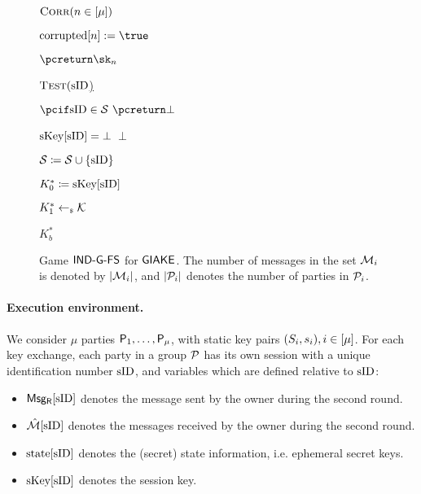 \begin{figure}[h!]
{{\begin{minipage}[t]{7cm}
				\underline{$\CorruptO(n \in [\mu])$}
				\begin{nicodemus}
					\item $\corrupted[n] := \true$
					\item $\pcreturn \sk_n$\\
				\end{nicodemus}
				
				\underline{$\TestO(\sID$)}
				\begin{nicodemus}
					\item $\pcif \sid\in\testSessions~ \pcreturn \bot$ 
					\item \pcif $\skeys[\sID] = \bot$~\pcreturn $\bot$
					\item $\testSessions \coloneqq \testSessions \cup \{\sid\}$
					\item $K_0^* \coloneqq \skeys[\sID]$
					\item $K_1^* \getsr \mathcal{K}$
					\item \pcreturn $K_b^*$
				\end{nicodemus}
			\end{minipage}
	}}
	\caption{
	Game $\GIAKEsecurityPFSGame$ for $\GIAKE$.
	The number of messages in the set $\GakeIniMesSet[\GakeUId]$ is denoted by $|\GakeIniMesSet[\GakeUId]|$, and 
	$|\peers_\GakeUId|$ denotes the number of parties in $\peers_\GakeUId$.
	\label{fig:game-ind-atk-gake}}
\end{figure}


\paragraph{Execution environment.} We consider $\mu$ parties $\User[1], \ldots, \User[\mu]$, with static key pairs $(\spk_i, \ssk_i), i \in [\mu]$. 
For each key exchange, each party in a group $\PartySet$ has its own session with a unique identification number $\sID$, and variables which are defined relative to $\sID$:

\begin{itemize}
	\item $\GResMes[\sID]$ denotes the message sent by the owner during the second round.
	\item $\GResMesSet[\sID]$ denotes the messages received by the owner during the second round.
	\item $\Gstates[\sID]$ denotes the (secret) state information, i.e. ephemeral secret keys.
	\item $\ListGakeSessKey[\sID]$ denotes the session key.
\end{itemize}

